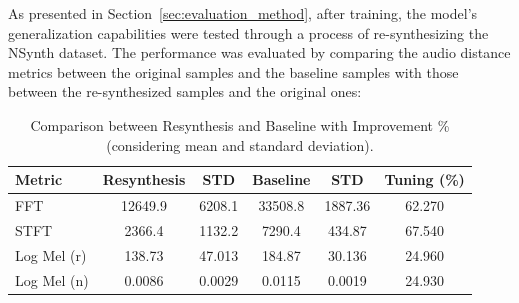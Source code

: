 \documentclass[sigconf,natbib=false]{acmart}
\begin{document}

As presented in Section~\ref{sec:evaluation_method}, after training, the model’s generalization capabilities were tested through a process of re-synthesizing the NSynth dataset. The performance was evaluated by comparing the audio distance metrics between the original samples and the baseline samples with those between the re-synthesized samples and the original ones:

\begin{table} \small %
  \caption{Comparison between Resynthesis and Baseline with Improvement \% (considering mean and standard deviation).}
  \label{tab:metrics}
\begin{tabular*}{\columnwidth}
	{@{\extracolsep{\fill}}lccccc}
    \toprule
    Metric & Resynthesis & STD & Baseline & STD & Tuning (\%) \\
    \midrule
    FFT  & 12649.9 & 6208.1 & 33508.8 & 1887.36  & 62.270 \\
    STFT  & 2366.4 & 1132.2  & 7290.4 & 434.87  & 67.540 \\
    Log Mel (r) & 138.73 & 47.013 & 184.87 & 30.136 & 24.960 \\
    Log Mel (n) & 0.0086 & 0.0029  & 0.0115 & 0.0019 & 24.930 \\
    \bottomrule
  \end{tabular*}
  \label{tab:metrics}
\end{table}
\end{document}
